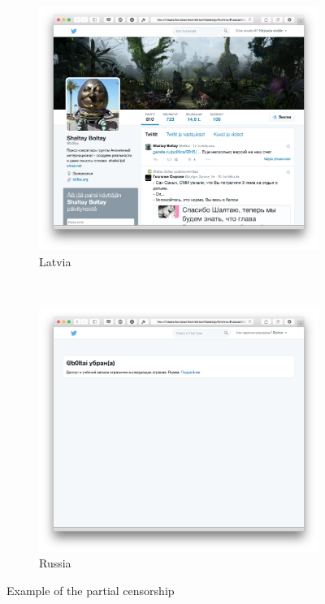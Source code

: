 \documentclass[conference]{IEEEtran}
\begin{document}
\begin{figure}
        \centering
        \begin{subfigure}{0.3\textwidth}
            \centering
            \includegraphics[width=\textwidth]{twi1.png}
            \caption{Latvia}
            \label{fig:pic1}
        \end{subfigure}
        \\
        \begin{subfigure}{0.3\textwidth}
            \centering
            \includegraphics[width=\textwidth]{twi2.png}
            \caption{Russia}
            \label{fig:pic2}
        \end{subfigure}
        \caption{Example of the partial censorship}
        \label{fig:partial}
    \end{figure}
\end{document}
